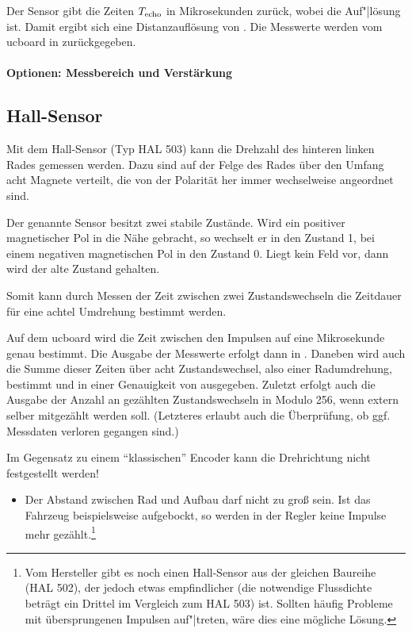 Der Sensor gibt die Zeiten $T_{\mathrm{echo}}$ in Mikrosekunden zurück, wobei die Auf"|lösung  ist. Damit ergibt sich eine Distanzauflösung von \ca {}. Die Messwerte werden vom ucboard in  zurückgegeben.


\paragraph{Optionen: Messbereich und Verstärkung}



\subsection{Hall-Sensor}

Mit dem Hall-Sensor (Typ HAL 503) kann die Drehzahl des hinteren linken Rades gemessen werden. Dazu sind auf der Felge des Rades über den Umfang acht Magnete verteilt, die von der Polarität her immer wechselweise angeordnet sind.

Der genannte Sensor besitzt zwei stabile Zustände. Wird ein positiver magnetischer Pol in die Nähe gebracht, so wechselt er in den Zustand 1, bei einem negativen magnetischen Pol in den Zustand 0. Liegt kein Feld vor, dann wird der alte Zustand gehalten. 

Somit kann durch Messen der Zeit zwischen zwei Zustandswechseln die Zeitdauer für eine achtel Umdrehung bestimmt werden. 

Auf dem ucboard wird die Zeit zwischen den Impulsen auf eine Mikrosekunde genau bestimmt. Die Ausgabe der Messwerte erfolgt dann in . Daneben wird auch die Summe dieser Zeiten über acht Zustandswechsel, also einer Radumdrehung, bestimmt und in einer Genauigkeit von  ausgegeben. Zuletzt erfolgt auch die Ausgabe der Anzahl an gezählten Zustandswechseln in Modulo 256, wenn extern selber mitgezählt werden soll. (Letzteres erlaubt auch die Überprüfung, ob ggf. Messdaten verloren gegangen sind.)

Im Gegensatz zu einem "`klassischen"' Encoder kann die Drehrichtung nicht festgestellt werden!

\begin{itemize}
	\item Der Abstand zwischen Rad und Aufbau darf nicht zu groß sein. Ist das Fahrzeug beispielsweise aufgebockt, so werden in der Regler keine Impulse mehr gezählt.\footnote{Vom Hersteller gibt es noch einen Hall-Sensor aus der gleichen Baureihe (HAL 502), der jedoch etwas empfindlicher (die notwendige Flussdichte beträgt \ca ein Drittel im Vergleich zum HAL 503) ist. Sollten häufig Probleme mit übersprungenen Impulsen auf"|treten, wäre dies eine mögliche Lösung.}
\end{itemize}


